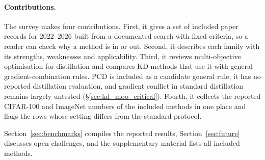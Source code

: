 \paragraph{Contributions.} The survey makes four contributions. First, it gives a set of included paper records for 2022--2026
built from a documented search with fixed criteria, so a reader can check why a method is in or out.
Second, it describes each family with its strengths, weaknesses and applicability. Third, it reviews multi-objective optimisation for distillation and compares KD methods that use it with general gradient-combination rules. PCD \citep{varam2026pcd} is included as a candidate general rule; it has no reported distillation evaluation, and gradient conflict in standard distillation remains largely untested (\S\ref{sec:kd_moo_critical}). Fourth, it
collects the reported CIFAR-100 and ImageNet numbers of the included methods in one place and flags the rows
whose setting differs from the standard protocol.

Section~\ref{sec:benchmarks} compiles the reported results, Section~\ref{sec:future} discusses open
challenges, and the supplementary material lists all included methods.

